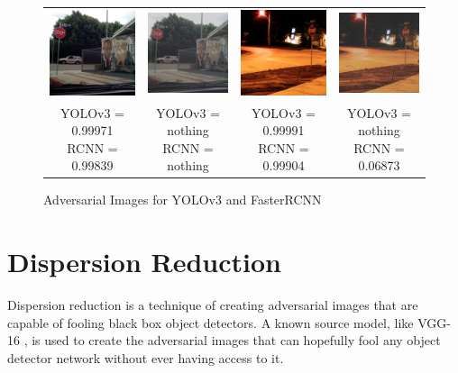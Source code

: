 \documentclass{article}
\begin{document}
\begin{figure}[h]
\begin{tabular}{c c@{\hskip 1cm} c c}
        \includegraphics[width=0.2\linewidth]{../test_images/stop3.png} &  \includegraphics[width=0.2\linewidth]{../test_images/ensemble_adversarials/stop3.png} & 
        \includegraphics[width=0.2\linewidth]{../test_images/stop4.png} &  \includegraphics[width=0.2\linewidth]{../test_images/ensemble_adversarials/stop4.png} \\

        \makecell[t]{YOLOv3 = 0.99971 \\ RCNN = 0.99839} & \makecell[t]{YOLOv3 = nothing \\ RCNN = nothing} & \makecell[t]{YOLOv3 = 0.99991 \\ RCNN = 0.99904} & \makecell[t]{YOLOv3 = nothing \\ RCNN = 0.06873} \\
    \end{tabular}
\caption{Adversarial Images for YOLOv3 and FasterRCNN}
\label{fig:yoloadversarial}
\end{figure}

\section{Dispersion Reduction}
Dispersion reduction \cite{Lu_2020_CVPR} is a technique of creating adversarial images that are capable of fooling black box object detectors. A known source model, like VGG-16 \cite{simonyan2015deep}, is used to create the adversarial images that can hopefully fool any object detector network without ever having access to it.
\end{document}
